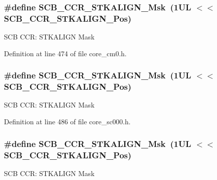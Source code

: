 \subsubsection[{\texorpdfstring{S\+C\+B\+\_\+\+C\+C\+R\+\_\+\+S\+T\+K\+A\+L\+I\+G\+N\+\_\+\+Msk}{SCB_CCR_STKALIGN_Msk}}]{\setlength{\rightskip}{0pt plus 5cm}\#define S\+C\+B\+\_\+\+C\+C\+R\+\_\+\+S\+T\+K\+A\+L\+I\+G\+N\+\_\+\+Msk~(1\+U\+L $<$$<$ S\+C\+B\+\_\+\+C\+C\+R\+\_\+\+S\+T\+K\+A\+L\+I\+G\+N\+\_\+\+Pos)}\hypertarget{group___c_m_s_i_s___s_c_b_ga33cf22d3d46af158a03aad25ddea1bcb}{}\label{group___c_m_s_i_s___s_c_b_ga33cf22d3d46af158a03aad25ddea1bcb}
S\+CB C\+CR\+: S\+T\+K\+A\+L\+I\+GN Mask 

Definition at line 474 of file core\+\_\+cm0.\+h.

\subsubsection[{\texorpdfstring{S\+C\+B\+\_\+\+C\+C\+R\+\_\+\+S\+T\+K\+A\+L\+I\+G\+N\+\_\+\+Msk}{SCB_CCR_STKALIGN_Msk}}]{\setlength{\rightskip}{0pt plus 5cm}\#define S\+C\+B\+\_\+\+C\+C\+R\+\_\+\+S\+T\+K\+A\+L\+I\+G\+N\+\_\+\+Msk~(1\+U\+L $<$$<$ S\+C\+B\+\_\+\+C\+C\+R\+\_\+\+S\+T\+K\+A\+L\+I\+G\+N\+\_\+\+Pos)}\hypertarget{group___c_m_s_i_s___s_c_b_ga33cf22d3d46af158a03aad25ddea1bcb}{}\label{group___c_m_s_i_s___s_c_b_ga33cf22d3d46af158a03aad25ddea1bcb}
S\+CB C\+CR\+: S\+T\+K\+A\+L\+I\+GN Mask 

Definition at line 486 of file core\+\_\+sc000.\+h.

\subsubsection[{\texorpdfstring{S\+C\+B\+\_\+\+C\+C\+R\+\_\+\+S\+T\+K\+A\+L\+I\+G\+N\+\_\+\+Msk}{SCB_CCR_STKALIGN_Msk}}]{\setlength{\rightskip}{0pt plus 5cm}\#define S\+C\+B\+\_\+\+C\+C\+R\+\_\+\+S\+T\+K\+A\+L\+I\+G\+N\+\_\+\+Msk~(1\+U\+L $<$$<$ S\+C\+B\+\_\+\+C\+C\+R\+\_\+\+S\+T\+K\+A\+L\+I\+G\+N\+\_\+\+Pos)}\hypertarget{group___c_m_s_i_s___s_c_b_ga33cf22d3d46af158a03aad25ddea1bcb}{}\label{group___c_m_s_i_s___s_c_b_ga33cf22d3d46af158a03aad25ddea1bcb}
S\+CB C\+CR\+: S\+T\+K\+A\+L\+I\+GN Mask 

